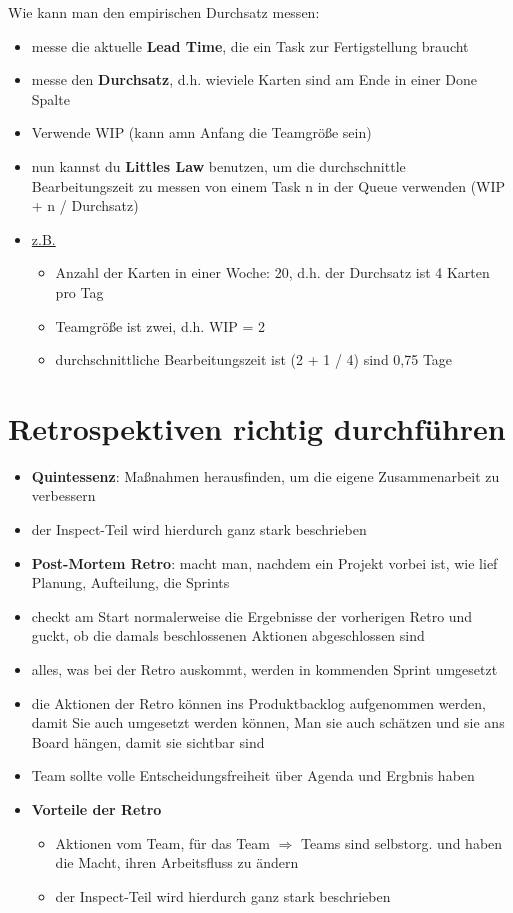 Wie kann man den empirischen Durchsatz messen:

\begin{itemize}
  \item messe die aktuelle \textbf{Lead Time}, die ein Task zur Fertigstellung braucht
  \item messe den \textbf{Durchsatz}, d.h. wieviele Karten sind am Ende in einer Done Spalte
  \item Verwende WIP (kann amn Anfang die Teamgröße sein)
  \item nun kannst du \textbf{Littles Law} benutzen, um die durchschnittle Bearbeitungszeit zu
    messen von einem Task n in der Queue verwenden (WIP + n / Durchsatz)
  \item \uline{z.B.}
    \begin{itemize}
      \item Anzahl der Karten in einer Woche: 20, d.h. der Durchsatz ist 4 Karten pro Tag
      \item Teamgröße ist zwei, d.h. WIP = 2
      \item durchschnittliche Bearbeitungszeit ist (2 + 1 / 4) sind 0,75 Tage
    \end{itemize}
\end{itemize}
\pagebreak


\section{Retrospektiven richtig durchführen}
\begin{itemize}
  \item \textbf{Quintessenz}: Maßnahmen herausfinden, um die eigene Zusammenarbeit zu verbessern
  \item der Inspect-Teil wird hierdurch ganz stark beschrieben
  \item \textbf{Post-Mortem Retro}: macht man, nachdem ein Projekt vorbei ist, wie lief
    Planung, Aufteilung, die Sprints
  \item checkt am Start normalerweise die Ergebnisse der vorherigen Retro und guckt, ob die damals beschlossenen Aktionen abgeschlossen sind
  \item alles, was bei der Retro auskommt, werden in kommenden Sprint umgesetzt
  \item die Aktionen der Retro können ins Produktbacklog aufgenommen werden, damit Sie auch
    umgesetzt werden können, Man sie auch schätzen und sie ans Board hängen, damit sie sichtbar sind
  \item Team sollte volle Entscheidungsfreiheit über Agenda und Ergbnis haben
  \item \textbf{Vorteile der Retro}
    \begin{itemize}
      \item Aktionen vom Team, für das Team $\Rightarrow$  Teams sind selbstorg. und haben die
        Macht, ihren Arbeitsfluss zu ändern
      \item der Inspect-Teil wird hierdurch ganz stark beschrieben
    \end{itemize}
\end{itemize}


